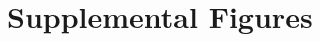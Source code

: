 \documentclass[../main.tex]{subfiles}
\begin{document}
\section{Supplemental Figures}

\blindtext
\end{document}
